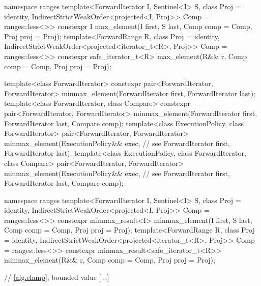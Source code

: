 \begin{addedblock}
\begin{codeblock}
  namespace ranges {
    template<ForwardIterator I, Sentinel<I> S, class Proj = identity,
        IndirectStrictWeakOrder<projected<I, Proj>> Comp = ranges::less<>>
      constexpr I max_element(I first, S last, Comp comp = Comp{}, Proj proj = Proj{});
    template<ForwardRange R, class Proj = identity,
        IndirectStrictWeakOrder<projected<iterator_t<R>, Proj>> Comp = ranges::less<>>
      constexpr safe_iterator_t<R>
        max_element(R&& r, Comp comp = Comp{}, Proj proj = Proj{});
  }
\end{codeblock}\end{addedblock}\begin{codeblock}
  template<class ForwardIterator>
    constexpr pair<ForwardIterator, ForwardIterator>
      minmax_element(ForwardIterator first, ForwardIterator last);
  template<class ForwardIterator, class Compare>
    constexpr pair<ForwardIterator, ForwardIterator>
      minmax_element(ForwardIterator first, ForwardIterator last, Compare comp);
  template<class ExecutionPolicy, class ForwardIterator>
    pair<ForwardIterator, ForwardIterator>
      minmax_element(ExecutionPolicy&& exec, // see 
                     ForwardIterator first, ForwardIterator last);
  template<class ExecutionPolicy, class ForwardIterator, class Compare>
    pair<ForwardIterator, ForwardIterator>
      minmax_element(ExecutionPolicy&& exec, // see 
                     ForwardIterator first, ForwardIterator last, Compare comp);
\end{codeblock}\begin{addedblock}\begin{codeblock}
  namespace ranges {
    template<ForwardIterator I, Sentinel<I> S, class Proj = identity,
        IndirectStrictWeakOrder<projected<I, Proj>> Comp = ranges::less<>>
      constexpr minmax_result<I>
        minmax_element(I first, S last, Comp comp = Comp{}, Proj proj = Proj{});
    template<ForwardRange R, class Proj = identity,
        IndirectStrictWeakOrder<projected<iterator_t<R>, Proj>> Comp = ranges::less<>>
      constexpr minmax_result<safe_iterator_t<R>>
        minmax_element(R&& r, Comp comp = Comp{}, Proj proj = Proj{});
  }
\end{codeblock}\end{addedblock}\begin{codeblock}

  // \ref{alg.clamp}, bounded value
  [...]


\end{codeblock}
